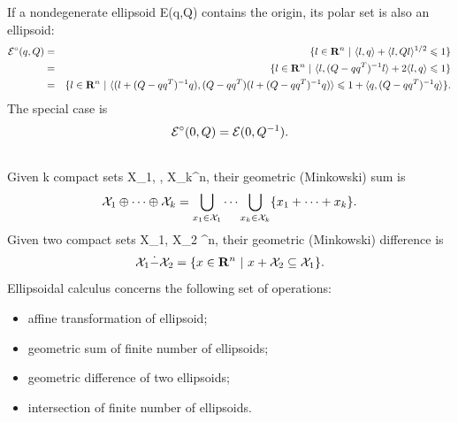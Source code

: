 \documentclass[letterpaper,10pt,english]{sphinxmanual}
\begin{document}
If a nondegenerate ellipsoid {\mathcal E}(q,Q) contains the
origin, its polar set is also an ellipsoid:
\begin{gather}
\begin{split}\begin{aligned}
{\mathcal E}^\circ(q,Q) & = & \{l\in{\bf R}^n ~|~ \langle l,q\rangle +
\langle l,Ql\rangle^{1/2}\leqslant1 \}\\
& = & \{l\in{\bf R}^n ~|~ \langle l,(Q-qq^T)^{-1}l\rangle +
2\langle l,q\rangle\leqslant1 \}\\
& = & \{l\in{\bf R}^n ~|~ \langle(l+(Q-qq^T)^{-1}q),
(Q-qq^T)(l+(Q-qq^T)^{-1}q)\rangle\leqslant1+\langle q,(Q-qq^T)^{-1}q\rangle \}.\end{aligned}\end{split}\notag
\end{gather}
The special case is
\begin{gather}
\begin{split}{\mathcal E}^\circ(0,Q) = {\mathcal E}(0,Q^{-1}).\end{split}\notag\\\begin{split}\end{split}\notag
\end{gather}
Given k compact sets
{\mathcal X}_1, \cdots, {\mathcal X}_k^n, their
geometric (Minkowski) sum is
\begin{gather}
\begin{split}{\mathcal X}_1\oplus\cdots\oplus{\mathcal X}_k=\bigcup_{x_1\in{\mathcal X}_1}\cdots\bigcup_{x_k\in{\mathcal X}_k}
\{x_1 + \cdots + x_k\} .  \label{minksum}\end{split}\notag
\end{gather}
Given two compact sets
{\mathcal X}_1, {\mathcal X}_2 ^n, their
geometric (Minkowski) difference is
\begin{gather}
\begin{split}{\mathcal X}_1\dot{-}{\mathcal X}_2 = \{x\in{\bf R}^n ~|~ x + {\mathcal X}_2 \subseteq {\mathcal X}_1 \}.
\label{minkdiff}\end{split}\notag
\end{gather}
Ellipsoidal calculus concerns the following set of operations:
\begin{itemize}
\item {} 
affine transformation of ellipsoid;

\item {} 
geometric sum of finite number of ellipsoids;

\item {} 
geometric difference of two ellipsoids;

\item {} 
intersection of finite number of ellipsoids.

\end{itemize}
\end{document}

